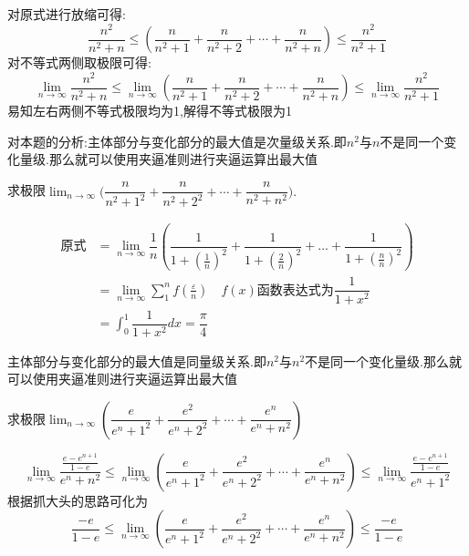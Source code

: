 \documentclass[8pt a4paper, oneside, UTF8]{ctexbook}
\begin{document}
\begin{sloppypar}
\begin{solution}
        对原式进行放缩可得:
        $$
            \dfrac{n^2}{n^2+n} \leqslant \left(\dfrac n{n^2+1}+\dfrac n{n^2+2}+\cdots+\dfrac n{n^2+n}\right) \leqslant \dfrac{n^2}{n^2+1}
        $$
        对不等式两侧取极限可得:
        $$
            \lim_{n \to \infty} \dfrac{n^2}{n^2+n} \leqslant \lim_{n \to \infty} \left(\dfrac n{n^2+1}+\dfrac n{n^2+2}+\cdots+\dfrac n{n^2+n}\right) \leqslant \lim_{n \to \infty} \dfrac{n^2}{n^2+1}
        $$
        易知左右两侧不等式极限均为1,解得不等式极限为1
    \end{solution}
    \begin{note}
        对本题的分析:主体部分与变化部分的最大值是次量级关系.即$n^2$与$n$不是同一个变化量级.那么就可以使用夹逼准则进行夹逼运算出最大值
    \end{note}
    \begin{problem}
        求极限$\lim_{n\to\infty}\Big(\dfrac n{n^2+1^2}+\dfrac n{n^2+2^2}+\cdots+\dfrac n{n^2+n^2}\Big).$    
    \end{problem}
    \begin{solution}
        \begin{align*}
          \text{原式} & = \lim_{n \to \infty}\dfrac{1}{n}(\dfrac{1}{1+(\frac{1}{n})^2}+\dfrac{1}{1+(\frac{2}{n})^2}+...+\dfrac{1}{1+(\frac{n}{n})^2})\\
          & = \lim_{n \to \infty} \sum_{1}^{n}f(\frac{\varepsilon}{n}) \quad f(x)\text{函数表达式为}\dfrac{1}{1+x^2}\\
          & = \int_0 ^1 \dfrac{1}{1+x^2} dx =\dfrac{\pi}{4}
        \end{align*}
    \end{solution}
    \begin{note}
        主体部分与变化部分的最大值是同量级关系.即$n^2$与$n^2$不是同一个变化量级.那么就可以使用夹逼准则进行夹逼运算出最大值
    \end{note}
    \begin{problem}
        求极限$\lim_{n\to\infty}\left(\dfrac{e}{e^{n}+1^{2}}+\dfrac{e^{2}}{e^{n}+2^{2}}+\cdots+\dfrac{e^{n}}{e^{n}+n^{2}}\right)$
    \end{problem}
    \begin{solution}
        $$\lim_{n \to \infty} \dfrac{\frac{e-e^{n+1}}{1-e}}{e^n+n^2} \leqslant \lim_{n\to\infty}\left(\dfrac{e}{e^{n}+1^{2}}+\dfrac{e^{2}}{e^{n}+2^{2}}+\cdots+\dfrac{e^{n}}{e^{n}+n^{2}}\right) \leqslant \lim_{n \to \infty} \dfrac{\frac{e-e^{n+1}}{1-e}}{e^n+1^2}$$
        根据抓大头的思路可化为
        $$
        \dfrac{-e}{1-e} \leqslant \lim_{n\to\infty}\left(\dfrac{e}{e^{n}+1^{2}}+\dfrac{e^{2}}{e^{n}+2^{2}}+\cdots+\dfrac{e^{n}}{e^{n}+n^{2}}\right) \leqslant \dfrac{-e}{1-e}
$$
\end{solution}
\end{sloppypar}
\end{document}
